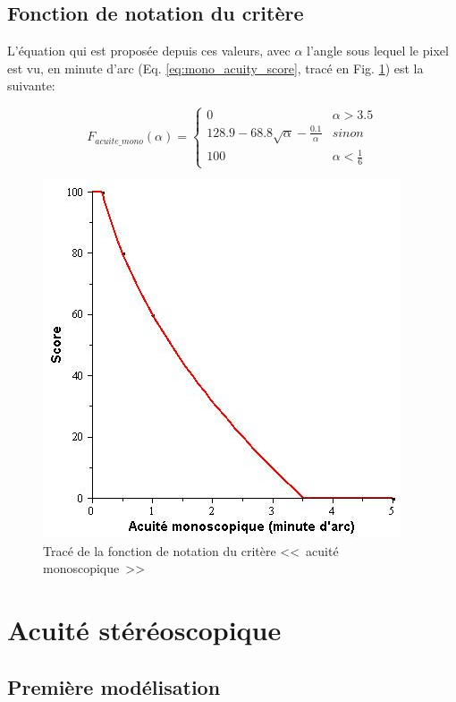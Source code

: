 	\subsection{Fonction de notation du critère}
	\par L'équation qui est proposée depuis ces valeurs, avec $\alpha$ l'angle sous lequel le pixel est vu, en minute d'arc (Eq. \ref{eq:mono_acuity_score}, tracé en Fig. \ref{fig:score_mono_acuity}) est la suivante:
	
	\begin{equation}
		F_{acuite\_mono}(\alpha) = \begin{cases}
		0 & \alpha > 3.5\\
		128.9 - 68.8 \sqrt{\alpha} - \frac{0.1}{\alpha} & sinon\\
		100 & \alpha < \frac{1}{6}
		\end{cases}
		\label{eq:mono_acuity_score}
	\end{equation}

	\begin{figure}[h]
		\centering
		\includegraphics[scale=.75]{Figures/AcuityMono}
		\caption{Tracé de la fonction de notation du critère <<~acuité monoscopique~>>}
		\label{fig:score_mono_acuity}
	\end{figure}
	
	\section{Acuité stéréoscopique}
	\subsection{Première modélisation}	
